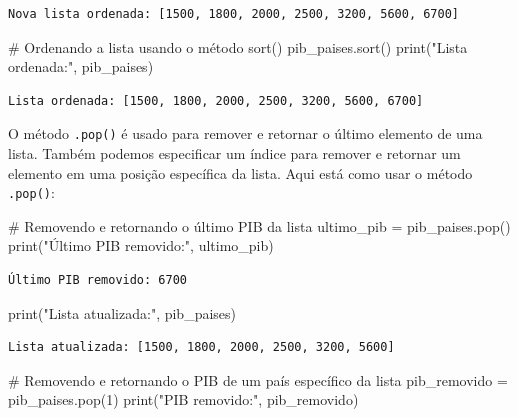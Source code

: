 \documentclass[
  portuguese,
  letterpaper,
  DIV=11,
  numbers=noendperiod]{scrreprt}
\newenvironment{Shaded}{\begin{snugshade}}{\end{snugshade}}
\newcommand{\BuiltInTok}[1]{\textcolor[rgb]{0.00,0.23,0.31}{#1}}
\newcommand{\CommentTok}[1]{\textcolor[rgb]{0.37,0.37,0.37}{#1}}
\newcommand{\DecValTok}[1]{\textcolor[rgb]{0.68,0.00,0.00}{#1}}
\newcommand{\NormalTok}[1]{\textcolor[rgb]{0.00,0.23,0.31}{#1}}
\newcommand{\OperatorTok}[1]{\textcolor[rgb]{0.37,0.37,0.37}{#1}}
\newcommand{\StringTok}[1]{\textcolor[rgb]{0.13,0.47,0.30}{#1}}
\theoremstyle{definition}
\theoremstyle{remark}
\begin{document}
\begin{verbatim}
Nova lista ordenada: [1500, 1800, 2000, 2500, 3200, 5600, 6700]
\end{verbatim}

\begin{Shaded}
\begin{Highlighting}[]
\CommentTok{\# Ordenando a lista usando o método sort()}
\NormalTok{pib\_paises.sort()}
\BuiltInTok{print}\NormalTok{(}\StringTok{"Lista ordenada:"}\NormalTok{, pib\_paises)}
\end{Highlighting}
\end{Shaded}

\begin{verbatim}
Lista ordenada: [1500, 1800, 2000, 2500, 3200, 5600, 6700]
\end{verbatim}

O método \texttt{.pop()} é usado para remover e retornar o último
elemento de uma lista. Também podemos especificar um índice para remover
e retornar um elemento em uma posição específica da lista. Aqui está
como usar o método \texttt{.pop()}:

\begin{Shaded}
\begin{Highlighting}[]
\CommentTok{\# Removendo e retornando o último PIB da lista}
\NormalTok{ultimo\_pib }\OperatorTok{=}\NormalTok{ pib\_paises.pop()}
\BuiltInTok{print}\NormalTok{(}\StringTok{"Último PIB removido:"}\NormalTok{, ultimo\_pib) }
\end{Highlighting}
\end{Shaded}

\begin{verbatim}
Último PIB removido: 6700
\end{verbatim}

\begin{Shaded}
\begin{Highlighting}[]
\BuiltInTok{print}\NormalTok{(}\StringTok{"Lista atualizada:"}\NormalTok{, pib\_paises)}
\end{Highlighting}
\end{Shaded}

\begin{verbatim}
Lista atualizada: [1500, 1800, 2000, 2500, 3200, 5600]
\end{verbatim}

\begin{Shaded}
\begin{Highlighting}[]
\CommentTok{\# Removendo e retornando o PIB de um país específico da lista}
\NormalTok{pib\_removido }\OperatorTok{=}\NormalTok{ pib\_paises.pop(}\DecValTok{1}\NormalTok{) }
\BuiltInTok{print}\NormalTok{(}\StringTok{"PIB removido:"}\NormalTok{, pib\_removido) }
\end{Highlighting}
\end{Shaded}
\end{document}
